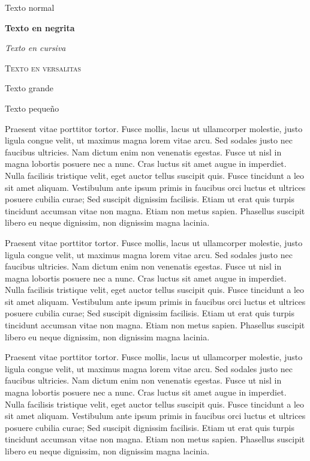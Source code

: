 

	
	
	
	Texto normal
	
	\textbf{Texto en negrita}
	
	\textit{Texto en cursiva}
	
	\textsc{Texto en versalitas}
	
	{\Large Texto grande}
	
	{\footnotesize Texto pequeño}
	
	Praesent vitae porttitor tortor. Fusce mollis, lacus ut ullamcorper molestie, justo ligula congue velit, ut maximus magna lorem vitae arcu. Sed sodales justo nec faucibus ultricies. Nam dictum enim non venenatis egestas. Fusce ut nisl in magna lobortis posuere nec a nunc. Cras luctus sit amet augue in imperdiet. Nulla facilisis tristique velit, eget auctor tellus suscipit quis. Fusce tincidunt a leo sit amet aliquam. Vestibulum ante ipsum primis in faucibus orci luctus et ultrices posuere cubilia curae; Sed suscipit dignissim facilisis. Etiam ut erat quis turpis tincidunt accumsan vitae non magna. Etiam non metus sapien. Phasellus suscipit libero eu neque dignissim, non dignissim magna lacinia.
	
	{\footnotesize Praesent \footnotesize vitae porttitor tortor. Fusce mollis, lacus ut ullamcorper molestie, justo ligula congue velit, ut maximus magna lorem vitae arcu. Sed sodales justo nec faucibus ultricies. Nam dictum enim non venenatis egestas. Fusce ut nisl in magna lobortis posuere nec a nunc. Cras luctus sit amet augue in imperdiet. Nulla facilisis tristique velit, eget auctor tellus suscipit quis. Fusce tincidunt a leo sit amet aliquam. Vestibulum ante ipsum primis in faucibus orci luctus et ultrices posuere cubilia curae; Sed suscipit dignissim facilisis. Etiam ut erat quis turpis tincidunt accumsan vitae non magna. Etiam non metus sapien. Phasellus suscipit libero eu neque dignissim, non dignissim magna lacinia}.
	
		{\Large Praesent vitae porttitor tortor. Fusce mollis, lacus ut ullamcorper molestie, justo ligula congue velit, ut maximus magna lorem vitae arcu. Sed sodales justo nec faucibus ultricies. Nam dictum enim non venenatis egestas. Fusce ut nisl in magna lobortis posuere nec a nunc. Cras luctus sit amet augue in imperdiet. Nulla facilisis tristique velit, eget auctor tellus suscipit quis. Fusce tincidunt a leo sit amet aliquam. Vestibulum ante ipsum primis in faucibus orci luctus et ultrices posuere cubilia curae; Sed suscipit dignissim facilisis. Etiam ut erat quis turpis tincidunt accumsan vitae non magna. Etiam non metus sapien. Phasellus suscipit libero eu neque dignissim, non dignissim magna lacinia.}
		
